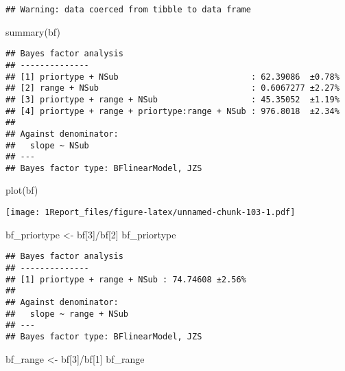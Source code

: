 \documentclass[
]{article}
\newenvironment{Shaded}{\begin{snugshade}}{\end{snugshade}}
\newcommand{\DecValTok}[1]{\textcolor[rgb]{0.00,0.00,0.81}{#1}}
\newcommand{\FunctionTok}[1]{\textcolor[rgb]{0.00,0.00,0.00}{#1}}
\newcommand{\NormalTok}[1]{#1}
\newcommand{\OtherTok}[1]{\textcolor[rgb]{0.56,0.35,0.01}{#1}}
\newcommand{\SpecialCharTok}[1]{\textcolor[rgb]{0.00,0.00,0.00}{#1}}
\begin{document}
\begin{verbatim}
## Warning: data coerced from tibble to data frame
\end{verbatim}

\begin{Shaded}
\begin{Highlighting}[]
\FunctionTok{summary}\NormalTok{(bf)}
\end{Highlighting}
\end{Shaded}

\begin{verbatim}
## Bayes factor analysis
## --------------
## [1] priortype + NSub                           : 62.39086  ±0.78%
## [2] range + NSub                               : 0.6067277 ±2.27%
## [3] priortype + range + NSub                   : 45.35052  ±1.19%
## [4] priortype + range + priortype:range + NSub : 976.8018  ±2.34%
## 
## Against denominator:
##   slope ~ NSub 
## ---
## Bayes factor type: BFlinearModel, JZS
\end{verbatim}

\begin{Shaded}
\begin{Highlighting}[]
\FunctionTok{plot}\NormalTok{(bf)}
\end{Highlighting}
\end{Shaded}

\texttt{[image: 1Report\_files/figure-latex/unnamed-chunk-103-1.pdf]}

\begin{Shaded}
\begin{Highlighting}[]
\NormalTok{ bf\_priortype }\OtherTok{\textless{}{-}}\NormalTok{ bf[}\DecValTok{3}\NormalTok{]}\SpecialCharTok{/}\NormalTok{bf[}\DecValTok{2}\NormalTok{]}
\NormalTok{ bf\_priortype}
\end{Highlighting}
\end{Shaded}

\begin{verbatim}
## Bayes factor analysis
## --------------
## [1] priortype + range + NSub : 74.74608 ±2.56%
## 
## Against denominator:
##   slope ~ range + NSub 
## ---
## Bayes factor type: BFlinearModel, JZS
\end{verbatim}

\begin{Shaded}
\begin{Highlighting}[]
\NormalTok{bf\_range }\OtherTok{\textless{}{-}}\NormalTok{ bf[}\DecValTok{3}\NormalTok{]}\SpecialCharTok{/}\NormalTok{bf[}\DecValTok{1}\NormalTok{]}
\NormalTok{bf\_range}
\end{Highlighting}
\end{Shaded}
\end{document}
